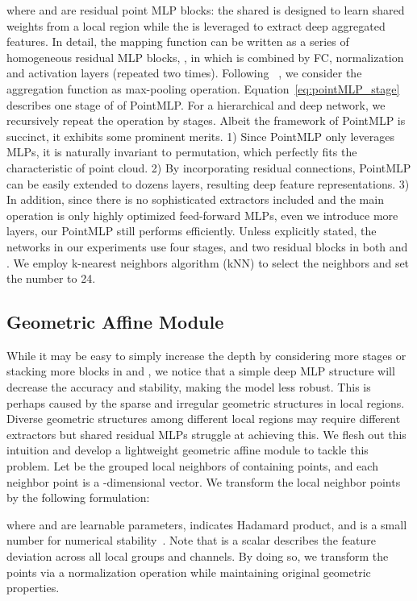 \documentclass{article} \usepackage{iclr2022_conference,times}
\begin{document}
where  and  are residual point MLP blocks: the shared  is designed to learn shared weights from a local region while the  is leveraged to extract deep aggregated features. In detail, the mapping function can be written as a series of homogeneous residual MLP blocks, , in which  is combined by FC, normalization and activation layers (repeated two times). Following ~\citet{qi2017pointnet}, we consider the aggregation function  as max-pooling operation.  Equation~\ref{eq:pointMLP_stage} describes one stage of of PointMLP. For a hierarchical and deep network, we recursively repeat the operation by  stages. Albeit the framework of PointMLP is succinct, it exhibits some prominent merits. 1) Since PointMLP only leverages MLPs, it is naturally invariant to permutation, which perfectly fits the characteristic of point cloud. 2) By incorporating residual connections, PointMLP can be easily extended to dozens layers, resulting deep feature representations. 3) In addition, since there is no sophisticated extractors included and the main operation is only highly optimized feed-forward MLPs, even we introduce more layers, our PointMLP still performs efficiently.  Unless explicitly stated, the networks in our experiments use four stages, and two residual blocks in both  and . We employ k-nearest neighbors algorithm (kNN) to select the neighbors and set the number  to 24. 


\subsection{Geometric Affine Module}
While it may be easy to simply increase the depth by considering more stages or stacking more blocks in  and , we notice that a simple deep MLP structure will decrease the accuracy and stability, making the model less robust. This is perhaps caused by the sparse and irregular geometric structures in local regions. Diverse geometric structures among different local regions may require different extractors but shared residual MLPs struggle at achieving this.  We flesh out this intuition and develop a lightweight geometric affine module to tackle this problem. Let   be the grouped local neighbors of  containing  points, and each neighbor point  is a -dimensional vector. We transform the local neighbor points by the following formulation:

where  and  are learnable parameters,  indicates Hadamard product, and  is a small number for numerical stability~\citep{ioffe2015batch,wu2018group,dixon1951introduction}. Note that  is a scalar describes the feature deviation across all local groups and channels.  By doing so, we transform the points via a normalization operation while maintaining original geometric properties.
\end{document}
